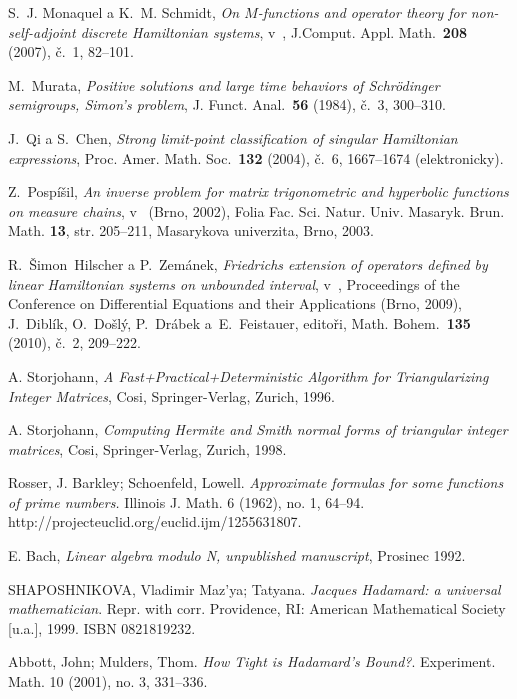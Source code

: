 \begin{thebibliography}{10}

S.~J. Monaquel a K.~M. Schmidt, \textit{On $M$-functions and operator
  theory for non-self-adjoint discrete Hamiltonian systems}, v~, J.Comput. Appl.
  Math.~\textbf{208} (2007), \v{c}.~1, 82--101.

M.~Murata, \textit{Positive solutions and large time behaviors of
  Schrödinger semigroups, Simon's problem}, J. Funct. Anal.~\textbf{56}
  (1984), č.~3, 300--310.

J.~Qi a S.~Chen, \textit{Strong limit-point classification of singular
  Hamiltonian expressions}, Proc. Amer. Math. Soc.~\textbf{132} (2004),
  č.~6, 1667--1674 (elektronicky).

Z.~Pospíšil, \textit{An inverse problem for matrix trigonometric and
  hyperbolic functions on measure chains}, v~ (Brno, 2002), Folia Fac.
  Sci. Natur. Univ. Masaryk. Brun. Math. {\bf 13}, str. 205--211, Masarykova
  univerzita, Brno, 2003.

R.~Šimon~Hilscher a P.~Zemánek, \textit{Friedrichs extension of
  operators defined by linear Hamiltonian systems on unbounded interval},
  v~, Proceedings of the Conference on Differential Equations and
  their Applications (Brno, 2009), J.~Diblík, O.~Došlý, P.~Drábek
  a~E.~Feistauer, editoři, Math. Bohem.~\textbf{135} (2010),
  č.~2, 209--222.

A. Storjohann, \textit{A Fast+Practical+Deterministic Algorithm for Triangularizing Integer Matrices},
Cosi, Springer-Verlag, Zurich, 1996.

A. Storjohann, \textit{Computing Hermite and Smith normal forms
of triangular integer matrices},
Cosi, Springer-Verlag, Zurich, 1998.

Rosser, J. Barkley; Schoenfeld, Lowell. \textit{Approximate formulas for some functions of prime numbers.} Illinois J. Math. 6 (1962), no. 1, 64--94. http://projecteuclid.org/euclid.ijm/1255631807.

E. Bach, \textit{Linear algebra modulo N, unpublished manuscript},
Prosinec 1992.

SHAPOSHNIKOVA, Vladimir Maz'ya; Tatyana. \textit{Jacques Hadamard: a universal mathematician}.
Repr. with corr. Providence, RI: American Mathematical Society [u.a.], 1999. ISBN 0821819232.

Abbott, John; Mulders, Thom. \textit{How Tight is Hadamard's Bound?}.
Experiment. Math. 10 (2001), no. 3, 331--336.

\end{thebibliography}

\cleardoublepage
